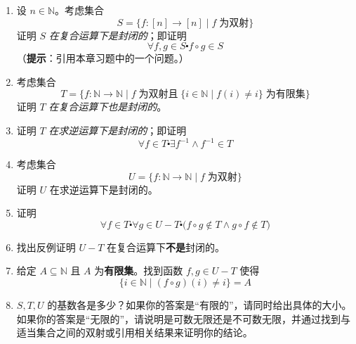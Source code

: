\begin{exercise}
    \begin{enumerate}[label=(\alph*)]
        \item 设 $n \in \mathbb{N}$。考虑集合
              \[S = \{f : [n] \to [n] \mid f \;\text{为双射} \}\]
              证明 $S$ \emph{在复合运算下是封闭的}；即证明
              \[\forall f, g \in S \centerdot f \circ g \in S\]
              （\textbf{提示}：引用本章习题中的一个问题。）
        \item 考虑集合
              \[T = \big\{ f : \mathbb{N} \to \mathbb{N} \mid f \;\text{为双射且}\; \{i \in \mathbb{N} \mid f(i) \ne i\} \;\text{为有限集}\big\}\]
              证明 $T$ \emph{在复合运算下也是封闭的}。
        \item 证明 $T$ \emph{在求逆运算下是封闭的}；即证明
              \[\forall f \in T \centerdot \exists f^{-1} \land f^{-1} \in T\]
        \item 考虑集合
              \[U = \{f : \mathbb{N} \to \mathbb{N} \mid f \;\text{为双射} \}\]
              证明 $U$ 在求逆运算下是封闭的。
        \item 证明
              \[\forall f \in T \centerdot \forall g \in U - T \centerdot \big(f \circ g \notin T \land g \circ f \notin T\big)\]
        \item 找出反例证明 $U-T$ 在复合运算下\textbf{不是}封闭的。
        \item 给定 $A \subseteq \mathbb{N}$ 且 $A$ 为\textbf{有限集}。找到函数 $f, g \in U - T$ 使得
              \[\{i \in \mathbb{N}  \mid (f \circ g)(i) \ne i\} = A\]
        \item $S, T, U$ 的基数各是多少？如果你的答案是``有限的''，请同时给出具体的大小。如果你的答案是``无限的''，请说明是可数无限还是不可数无限，并通过找到与适当集合之间的双射或引用相关结果来证明你的结论。
    \end{enumerate}
\end{exercise}